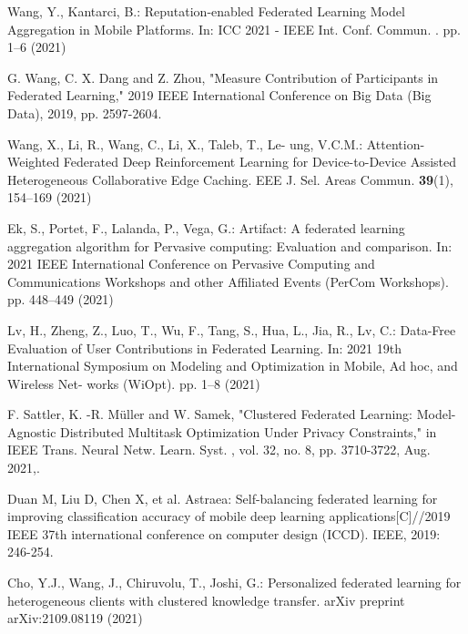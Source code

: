 \documentclass[twoside,twocolumn]{article}
\begin{document}
\begin{spacing}{1.0}
\begin{thebibliography}{00}
    Wang, Y., Kantarci, B.: Reputation-enabled Federated Learning Model Aggregation in Mobile Platforms. In: ICC 2021 - IEEE Int. Conf. Commun. . pp. 1–6 (2021)
 \vspace{-0.3cm}

  G. Wang, C. X. Dang and Z. Zhou, "Measure Contribution of Participants in Federated Learning," 2019 IEEE International Conference on Big Data (Big Data), 2019, pp. 2597-2604.
 \vspace{-0.3cm}
 
   Wang, X., Li, R., Wang, C., Li, X., Taleb, T., Le- ung, V.C.M.: Attention-Weighted Federated Deep Reinforcement Learning for Device-to-Device Assisted Heterogeneous Collaborative Edge Caching. EEE J. Sel. Areas Commun. \textbf{39}(1), 154–169 (2021)
 \vspace{-0.3cm}
 
    Ek, S., Portet, F., Lalanda, P., Vega, G.: Artifact: A federated learning aggregation algorithm for Pervasive computing: Evaluation and comparison. In: 2021 IEEE International Conference on Pervasive Computing and Communications Workshops and other Affiliated Events (PerCom Workshops). pp. 448–449 (2021)
   \vspace{-0.3cm}
   
    Lv, H., Zheng, Z., Luo, T., Wu, F., Tang, S., Hua, L., Jia, R., Lv, C.: Data-Free Evaluation of User Contributions in Federated Learning. In: 2021 19th International Symposium on Modeling and Optimization in Mobile, Ad hoc, and Wireless Net- works (WiOpt). pp. 1–8 (2021)
 \vspace{-0.3cm}
 
       F. Sattler, K. -R. Müller and W. Samek, "Clustered Federated Learning: Model-Agnostic Distributed Multitask Optimization Under Privacy Constraints," in IEEE Trans. Neural Netw. Learn. Syst. , vol. 32, no. 8, pp. 3710-3722, Aug. 2021,.
 \vspace{-0.3cm}
 
    Duan M, Liu D, Chen X, et al. Astraea: Self-balancing federated learning for improving classification accuracy of mobile deep learning applications[C]//2019 IEEE 37th international conference on computer design (ICCD). IEEE, 2019: 246-254.
 \vspace{-0.5cm}
 
   Cho, Y.J., Wang, J., Chiruvolu, T., Joshi, G.: Personalized federated learning for heterogeneous clients with clustered knowledge transfer. arXiv preprint arXiv:2109.08119 (2021)
 \vspace{-0.3cm}
 

\end{thebibliography}
\end{spacing}
\end{document}
